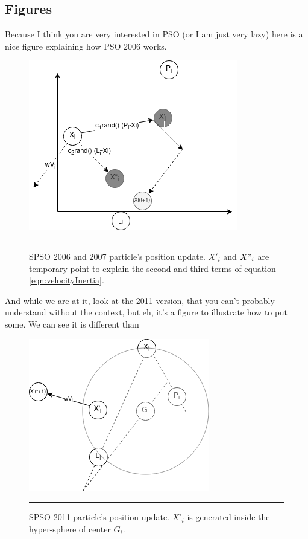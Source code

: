 \documentclass[../Thesis]{subfiles}
\begin{document}
\subsection{Figures}
Because I think you are very interested in PSO (or I am just very lazy) here is a nice figure explaining how PSO 2006 works.
\begin{figure}[H] 
    \centering 
    \includegraphics[]{Figures/pso2006.png} 
    \rule{35em}{0.5pt} 
    \caption[SPSO 06/07 movement]{SPSO 2006 and 2007 particle's position update. $X'_{i}$ and $X"_{i}$ are temporary point to explain the second and third terms of equation \ref{eqn:velocityInertia}.} 
    \label{fig:schemaPSO2006Update} 
\end{figure} 


\clearpage %

And while we are at it, look at the 2011 version, that you can't probably understand without the context, but eh, it's a figure to illustrate how to put some. We can see it is different than 
\begin{figure}[H] 
    \centering 
    \includegraphics[]{Figures/pso2011.png} 
    \rule{35em}{0.5pt} 
    \caption[SPSO 2011 movement]{SPSO 2011 particle's position update. $X'_{i}$ is generated inside the hyper-sphere of center $G_{i}$.} 
    \label{fig:schemaPSO2011Update} 
\end{figure}
\end{document}
